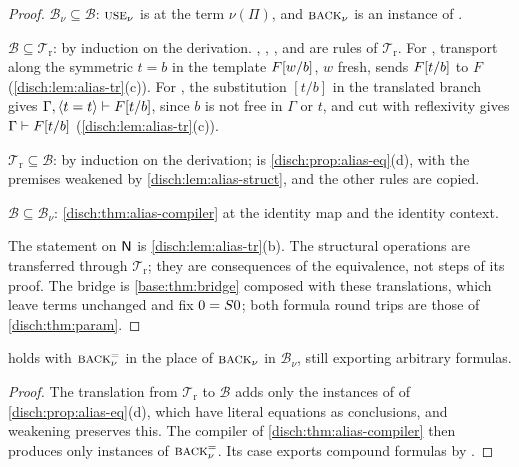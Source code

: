 \begin{proof}
$\mathcal B_{\nu}\subseteq\mathcal B$: $\rulename{Use}_{\nu}$ is
 at the term $\nu(\Pi)$, and $\rulename{Back}_{\nu}$ is an
instance of .

$\mathcal B\subseteq\mathcal T_{\mathrm r}$: by induction on the
derivation. , , , 
and  are rules of $\mathcal T_{\mathrm r}$. For
, transport along the symmetric $t=b$ in the template
$F[w/b]$, $w$ fresh, sends $F[t/b]$ to $F$
(\cref{disch:lem:alias-tr}(c)). For , the substitution
$[t/b]$ in the translated branch gives
$\Gamma,\langle t=t\rangle\vdash F[t/b]$, since $b$ is not free in
$\Gamma$ or $t$, and cut with reflexivity gives
$\Gamma\vdash F[t/b]$ (\cref{disch:lem:alias-tr}(c)).

$\mathcal T_{\mathrm r}\subseteq\mathcal B$: by induction on the
derivation;  is \cref{disch:prop:alias-eq}(d), with the
premises weakened by \cref{disch:lem:alias-struct}, and the other rules are
copied.

$\mathcal B\subseteq\mathcal B_{\nu}$: \cref{disch:thm:alias-compiler} at
the identity map and the identity context.

The statement on $\mathsf{N}$ is \cref{disch:lem:alias-tr}(b). The structural
operations are transferred through $\mathcal T_{\mathrm r}$; they are
consequences of the equivalence, not steps of its proof. The bridge is
\cref{base:thm:bridge} composed with these translations, which leave terms
unchanged and fix $0=S 0$; both formula round trips are those of
\cref{disch:thm:param}.
\end{proof}

\begin{corollary}
\label{disch:cor:alias-eqback}
 holds with $\rulename{Back}^{=}_{\nu}$ in the
place of $\rulename{Back}_{\nu}$ in $\mathcal B_{\nu}$, 
still exporting arbitrary formulas.
\end{corollary}

\begin{proof}
The translation from $\mathcal T_{\mathrm r}$ to $\mathcal B$ adds only the
instances of  of \cref{disch:prop:alias-eq}(d), which have
literal equations as conclusions, and weakening preserves this. The
compiler of \cref{disch:thm:alias-compiler} then produces only instances of
$\rulename{Back}^{=}_{\nu}$. Its  case exports compound
formulas by .
\end{proof}

